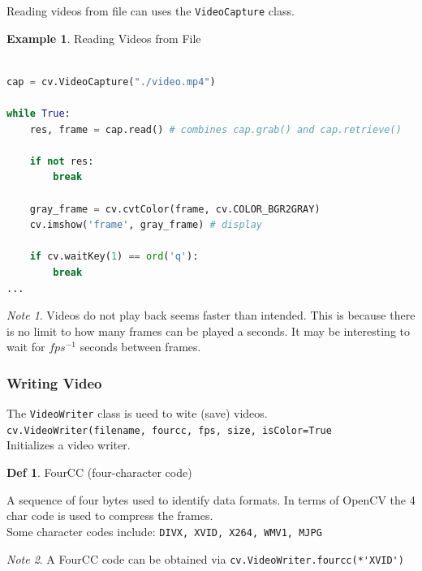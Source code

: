 \documentclass{article}
\theoremstyle{definition}
\newtheorem{df}{Def}
\newtheorem{ex}{Example}[subsection]
\theoremstyle{remark}
\newtheorem*{nb}{Note}
\newcommand{\func}[2]{\noindent\lstinline{#1}\\#2}
\begin{document}
Reading videos from file can uses the \lstinline{VideoCapture} class. 

\begin{ex}Reading Videos from File
\begin{lstlisting}[language=Python]

cap = cv.VideoCapture("./video.mp4")

while True:
    res, frame = cap.read() # combines cap.grab() and cap.retrieve()

    if not res:
        break

    gray_frame = cv.cvtColor(frame, cv.COLOR_BGR2GRAY)
    cv.imshow('frame', gray_frame) # display

    if cv.waitKey(1) == ord('q'):
        break
...
\end{lstlisting}
\begin{nb}
    Videos do not play back seems faster than intended. This is because there is no limit to how many frames can be played a seconds. It may be interesting to wait for $ fps^{-1} $ seconds between frames.
\end{nb}
\end{ex}

\subsubsection{Writing Video}

The \lstinline{VideoWriter} class is ueed to wite (save) videos.\\ 

\func{cv.VideoWriter(filename, fourcc, fps, size, isColor=True}{
Initializes a video writer.\\
}

\begin{df}FourCC (four-character code)

A sequence of four bytes used to identify data formats. In terms of OpenCV the 4 char code is used to compress the frames.\\

\noindent Some character codes include: \lstinline{DIVX, XVID, X264, WMV1, MJPG}
\end{df}

\begin{nb}
    A FourCC code can be obtained via \lstinline{cv.VideoWriter.fourcc(*'XVID')}
\end{nb}
   
\end{document}
